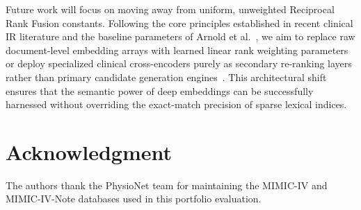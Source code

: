 \documentclass[conference]{IEEEtran}
\begin{document}
Future work will focus on moving away from uniform, unweighted Reciprocal Rank Fusion constants. Following the core principles established in recent clinical IR literature and the baseline parameters of Arnold et al.~\cite{arnold2020learning}, we aim to replace raw document-level embedding arrays with learned linear rank weighting parameters or deploy specialized clinical cross-encoders purely as secondary re-ranking layers rather than primary candidate generation engines~\cite{reimers2019sentence,cormack2009reciprocal,arnold2020learning}. This architectural shift ensures that the semantic power of deep embeddings can be successfully harnessed without overriding the exact-match precision of sparse lexical indices.

\section*{Acknowledgment}
The authors thank the PhysioNet team for maintaining the MIMIC-IV and MIMIC-IV-Note databases used in this portfolio evaluation.
\end{document}
